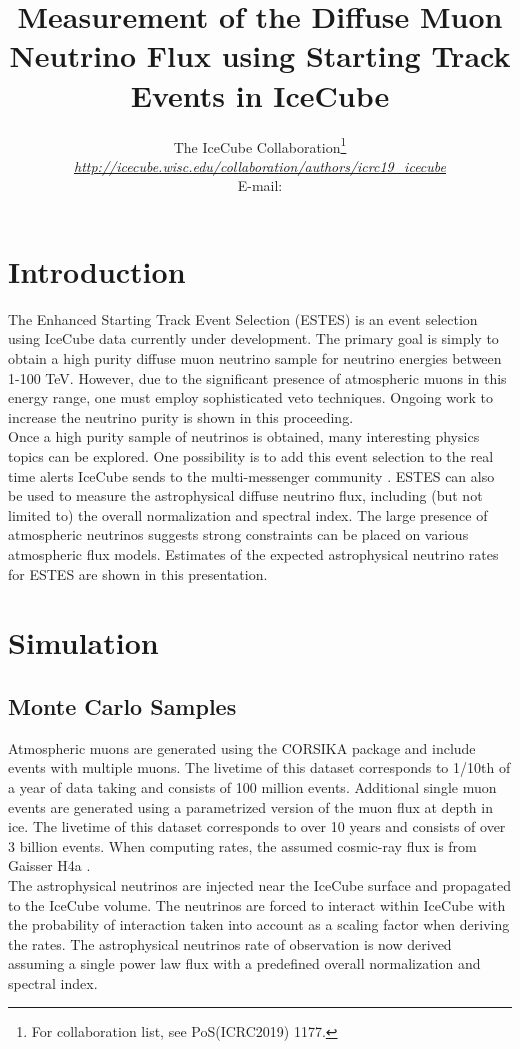 \documentclass{PoS}
\title{Measurement of the Diffuse Muon Neutrino Flux using Starting Track Events in IceCube}
\author{
The IceCube Collaboration\footnote{For collaboration list, see PoS(ICRC2019) 1177.}\\
{\itshape \href{http://icecube.wisc.edu/collaboration/authors/icrc19_icecube}{http://icecube.wisc.edu/collaboration/authors/icrc19\_icecube}}\\
E-mail: \email{msilva@icecube.wisc.edu, smancina@icecube.wisc.edu}
}
\begin{document}

\section{Introduction}\label{sec:info}
The Enhanced Starting Track Event Selection (ESTES) is an event selection using IceCube data currently under development. The primary goal is simply to obtain a high purity diffuse muon neutrino sample for neutrino energies between 1-100 TeV. However, due to the significant presence of atmospheric muons in this energy range, one must employ sophisticated veto techniques. Ongoing work to increase the neutrino purity is shown in this proceeding. \\
Once a high purity sample of neutrinos is obtained, many interesting physics topics can be explored. One possibility is to add this event selection to the real time alerts IceCube sends to the multi-messenger community \cite{ESTESv1:2019icrc_ESTESv1}. ESTES can also be used to measure the astrophysical diffuse neutrino flux, including (but not limited to) the overall normalization and spectral index. The large presence of atmospheric neutrinos suggests strong constraints can be placed on various atmospheric flux models. Estimates of the expected astrophysical neutrino rates for ESTES are shown in
this presentation. 


\section{Simulation}\label{sec:sim}

\subsection{Monte Carlo Samples}\label{sec:MC}
Atmospheric muons are generated using the CORSIKA package and include events with multiple muons. The livetime of this dataset corresponds to 1/10th of a year of data taking and consists of 100 million events. Additional single muon events are generated using a parametrized version of the muon flux at depth in ice. The livetime of this dataset corresponds to over 10 years and consists of over 3 billion events. When computing rates, the assumed cosmic-ray flux is from Gaisser H4a \cite{h3a_flux}.\\
The astrophysical neutrinos are injected near the IceCube surface and propagated to the IceCube volume. The neutrinos are forced to interact within IceCube with the probability of interaction taken into account as a scaling factor when deriving the rates. The astrophysical neutrinos rate of observation is now derived assuming a single power law flux with a predefined overall normalization and spectral index.
\end{document}
